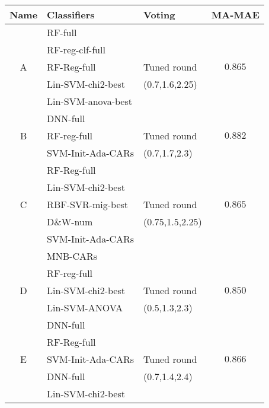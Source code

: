 





\begin{table}
    \centering
    \begin{tabular}{|cllc|}
    \hline
    \textsf{Name}  & \textsf{Classifiers}& \textsf{Voting}&
    \textsf{MA-MAE}\\
    \hline
        & \textsf{RF-full}  &    & \\
        & \textsf{RF-reg-clf-full} &  &  \\
    \textsf{A}    & \textsf{RF-Reg-full} &   Tuned round & $0.865$\\
        & \textsf{Lin-SVM-chi2-best} &     (0.7,1.6,2.25)& \\
        & \textsf{Lin-SVM-anova-best} &  & \\
        & \textsf{DNN-full}& & \\
    \hline
    \textsf{B}    & \textsf{RF-reg-full} & Tuned round& $0.882$ \\
        & \textsf{SVM-Init-Ada-CARs} &   (0.7,1.7,2.3)& \\
    \hline
        & \textsf{RF-Reg-full} &  & \\
        & \textsf{Lin-SVM-chi2-best} & & \\
    \textsf{C}    & \textsf{RBF-SVR-mig-best} & Tuned round & $0.865$  \\
        & \textsf{D\&W-num} &   (0.75,1.5,2.25)& \\
        & \textsf{SVM-Init-Ada-CARs} & & \\
        & \textsf{MNB-CARs} & & \\
    \hline
         &  \textsf{RF-reg-full} & & \\
    \textsf{D}     &  \textsf{Lin-SVM-chi2-best} & Tuned round & $0.850$ \\
         &  \textsf{Lin-SVM-ANOVA}&  (0.5,1.3,2.3) & \\
         &  \textsf{DNN-full}  & & \\
    \hline
        & \textsf{RF-Reg-full} &  & \\
    \textsf{E}    & \textsf{SVM-Init-Ada-CARs} & Tuned round & $0.866$ \\
        & \textsf{DNN-full} &  (0.7,1.4,2.4) & \\
        & \textsf{Lin-SVM-chi2-best} & & \\
    \hline


\end{tabular}
\end{table}
